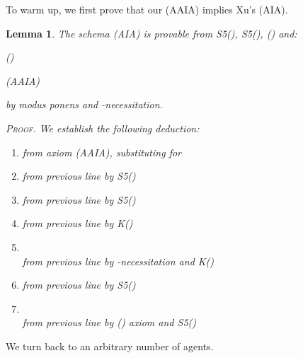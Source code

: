 \documentclass{article}
\newtheorem{lemma}{Lemma}
\newenvironment{pf}{\em \medskip\noindent \textsc{Proof.}}
{\hspace*{\fill}\nolinebreak[2]\hspace*{\fill}\medskip}
\newcommand{\InclBox}[1]{}
\begin{document}
To warm up, we first prove that our (AAIA) implies Xu's (AIA).

\begin{lemma}\label{ortho-theo}
The schema (AIA) is provable from
S5(), S5(), (\InclBox{i})
and:
\begin{itemlist}{(\InclBox{i})}
  \item[(AAIA)]

\end{itemlist}
by modus ponens and -necessitation.


\begin{pf}
We establish the following deduction:
\begin{enumerate}
 \item  \hfill from axiom (AAIA), substituting  for 
\item  \hfill from previous line by S5()
\item     \hfill from previous line by S5()
\item  \hfill from previous line by K()
\item  \\
 \hfill from previous line by -necessitation and K()
\item  \hfill from previous line by S5()
\item  \\    
\hfill from previous line by (\InclBox{i}) axiom
and S5()

\end{enumerate}
\end{pf}

\end{lemma}

We turn back to an arbitrary number of agents.
\end{document}
